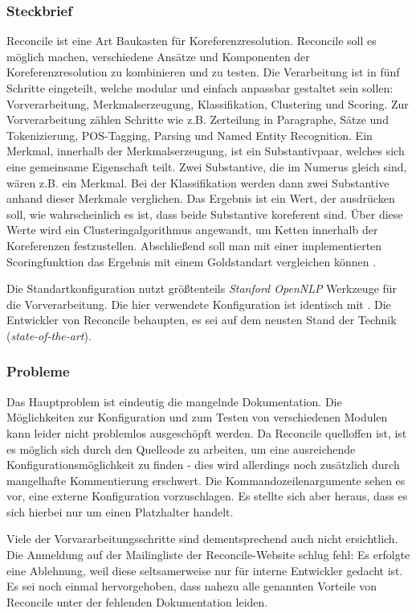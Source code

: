 \subsubsection{Steckbrief}

Reconcile ist eine Art Baukasten für Koreferenzresolution. Reconcile soll es möglich machen, verschiedene Ansätze und Komponenten der Koreferenzresolution zu kombinieren und zu testen. Die Verarbeitung ist in fünf Schritte eingeteilt, welche modular und einfach anpassbar gestaltet sein sollen: Vorverarbeitung, Merkmalserzeugung, Klassifikation, Clustering und Scoring. Zur Vorverarbeitung zählen Schritte wie z.B. Zerteilung in Paragraphe, Sätze und Tokenizierung, POS-Tagging, Parsing und Named Entity Recognition. Ein Merkmal, innerhalb der Merkmalserzeugung, ist ein Substantivpaar, welches sich eine gemeinsame Eigenschaft teilt. Zwei Substantive, die im Numerus gleich sind, wären z.B. ein Merkmal. Bei der Klassifikation werden dann zwei Substantive anhand dieser Merkmale verglichen. Das Ergebnis ist ein Wert, der ausdrücken soll, wie wahrscheinlich es ist, dass beide Substantive koreferent sind. Über diese Werte wird ein Clusteringalgorithmus angewandt, um Ketten innerhalb der Koreferenzen festzustellen. Abschließend soll man mit einer implementierten Scoringfunktion das Ergebnis mit einem Goldstandart vergleichen können \autocite{reconcile2}.

Die Standartkonfiguration nutzt größtenteils \emph{Stanford OpenNLP} Werkzeuge für die Vorverarbeitung. Die hier verwendete Konfiguration ist identisch mit \autocite{reconcile}. Die Entwickler von Reconcile behaupten, es sei auf dem neusten Stand der Technik (\emph{state-of-the-art}).

\subsubsection{Probleme}
Das Hauptproblem ist eindeutig die mangelnde Dokumentation. Die Möglichkeiten zur Konfiguration und zum Testen von verschiedenen Modulen kann leider nicht problemlos ausgeschöpft werden. Da Reconcile quelloffen ist, ist es möglich sich durch den Quellcode zu arbeiten, um eine ausreichende Konfigurationsmöglichkeit zu finden - dies wird allerdings noch zusätzlich durch mangelhafte Kommentierung erschwert. Die Kommandozeilenargumente sehen es vor, eine externe Konfiguration vorzuschlagen. Es stellte sich aber heraus, dass es sich hierbei nur um einen Platzhalter handelt.

Viele der Vorvararbeitungsschritte sind dementsprechend auch nicht ersichtlich. Die Anmeldung auf der Mailingliste der Reconcile-Website schlug fehl: Es erfolgte eine Ablehnung, weil diese seltsamerweise nur für interne Entwickler gedacht ist. Es sei noch einmal hervorgehoben, dass nahezu alle genannten Vorteile von Reconcile unter der fehlenden Dokumentation leiden.
